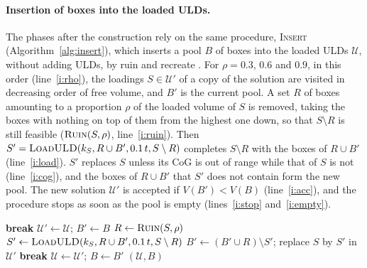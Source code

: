 \paragraph{Insertion of boxes into the loaded ULDs.}
The phases after the construction rely on the same procedure, \textsc{Insert}
(Algorithm~\ref{alg:insert}), which inserts a pool $B$ of boxes into the loaded ULDs
$\mathcal{U}$, without adding ULDs, by ruin and recreate \citep{Schrimpf2000}. For
$\rho = 0.3$, $0.6$ and $0.9$, in this order (line~\ref{i:rho}), the loadings $S \in \mathcal{U}'$
of a copy of the solution are visited in decreasing order of free volume, and $B'$ is the current
pool. A set $R$ of boxes amounting to a proportion $\rho$ of the loaded volume of $S$ is removed,
taking the boxes with nothing on top of them from the highest one down, so that $S \setminus R$ is
still feasible ($\textsc{Ruin}(S, \rho)$, line~\ref{i:ruin}). Then
$S' = \textsc{LoadULD}(k_S, R \cup B', 0.1\,t, S \setminus R)$ completes $S \setminus R$ with the
boxes of $R \cup B'$ (line~\ref{i:load}). $S'$ replaces $S$ unless its CoG is out of range while
that of $S$ is not (line~\ref{i:cog}), and the boxes of $R \cup B'$ that $S'$ does not contain form
the new pool. The new solution $\mathcal{U}'$ is accepted if $V(B') < V(B)$
(line~\ref{i:acc}), and the procedure stops as soon as the pool is empty
(lines~\ref{i:stop} and~\ref{i:empty}).

\begin{algorithm}[htbp]
\caption{\textsc{Insert}$(\mathcal{U}, B)$: insert the boxes of the pool $B$ into the loaded ULDs
$\mathcal{U}$ by ruin and recreate; returns the new loaded ULDs and pool.}
\label{alg:insert}
\begin{algorithmic}[1]
 \label{i:rho}
	 \textbf{break} \EndIf \label{i:empty}
	\State $\mathcal{U}' \gets \mathcal{U}$; $B' \gets B$
		\State $R \gets \textsc{Ruin}(S, \rho)$  \label{i:ruin}
		\State $S' \gets \textsc{LoadULD}(k_S, R \cup B', 0.1\,t, S \setminus R)$  \label{i:load}
		 \label{i:cog}
			\State $B' \gets (B' \cup R) \setminus S'$; replace $S$ by $S'$ in $\mathcal{U}'$
		\EndIf
		 \textbf{break} \EndIf \label{i:stop}
	\EndFor
	 $\mathcal{U} \gets \mathcal{U}'$; $B \gets B'$ \EndIf \label{i:acc}
\EndFor
\State \Return $(\mathcal{U}, B)$
\end{algorithmic}
\end{algorithm}

